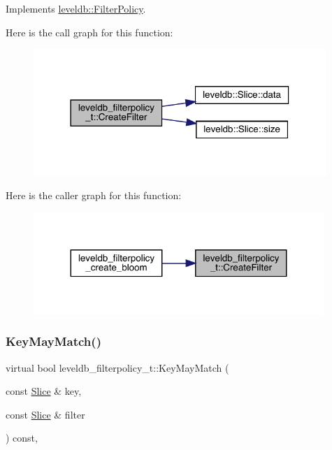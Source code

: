 Implements \mbox{\hyperlink{classleveldb_1_1_filter_policy_a355e9797e16dd16b93d19056781126b2}{leveldb\+::\+Filter\+Policy}}.

Here is the call graph for this function\+:
\nopagebreak
\begin{figure}[H]
\begin{center}
\leavevmode
\includegraphics[width=314pt]{structleveldb__filterpolicy__t_aa833af852917381cd8db4c8ec21a3762_cgraph}
\end{center}
\end{figure}
Here is the caller graph for this function\+:
\nopagebreak
\begin{figure}[H]
\begin{center}
\leavevmode
\includegraphics[width=311pt]{structleveldb__filterpolicy__t_aa833af852917381cd8db4c8ec21a3762_icgraph}
\end{center}
\end{figure}
\mbox{\label{structleveldb__filterpolicy__t_a76ed49d956a58622e86d87a89a9ba1f1}} 
\subsubsection{\texorpdfstring{KeyMayMatch()}{KeyMayMatch()}}
{\footnotesize\ttfamily virtual bool leveldb\+\_\+filterpolicy\+\_\+t\+::\+Key\+May\+Match (\begin{DoxyParamCaption}\item[{const \mbox{\hyperlink{classleveldb_1_1_slice}{Slice}} \&}]{key,  }\item[{const \mbox{\hyperlink{classleveldb_1_1_slice}{Slice}} \&}]{filter }\end{DoxyParamCaption}) const\hspace{0.3cm}{\ttfamily [inline]}, {\ttfamily [virtual]}}




